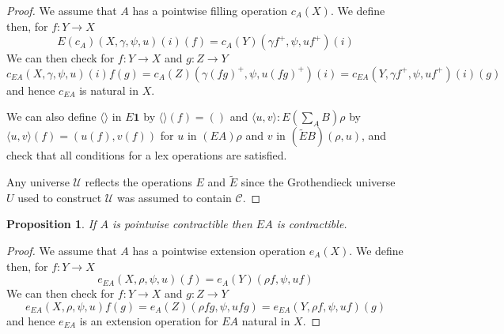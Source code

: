\documentclass[10pt,a4paper,draft]{article}
\newcommand{\Unit}{\mathbf{1}}
\newcommand{\UU}{\mathcal{U}}%
\newcommand{\CC}{{\mathcal C}}
\newcommand{\unit}{()} %
\newcommand{\unitF}{\langle \rangle}
\newcommand{\pairF}[2]{\langle #1,#2 \rangle}
\newcommand{\E}{E}
\newcommand{\EE}{\tilde{E}}
\renewcommand{\~}{\widetilde}
\newtheorem{proposition}[theorem]{Proposition}
\theoremstyle{definition}
\theoremstyle{remark} %
\begin{document}
\begin{proof}
  We assume that $A$ has a pointwise filling operation $c_A(X)$.
  We define then, for $f:Y\rightarrow X$
  \begin{equation*}
  \E(c_A)(X,\gamma,\psi,u)(i)(f) = c_A(Y)( \gamma f^+,\psi,u f^+)(i)
  \end{equation*}
  We can then check for $f:Y\rightarrow X$ and $g:Z\rightarrow Y$
  \begin{equation*}
  c_{\E A}(X,\gamma,\psi,u)(i)f(g) =
  c_A(Z)( \gamma (f g)^+,\psi,u (f g)^+)(i) =
  c_{\E A}(Y, \gamma f^+,\psi, u f^+)(i)(g)
  \end{equation*}
  and hence $c_{\E A}$ is natural in $X$.

  We can also define $\unitF$ in $\E \Unit$ by $\unitF(f) = \unit$
  and $\pairF{u}{v}:\E(\sum_A B)\rho$
  by $\pairF{u}{v}(f) = (u(f),v(f))$ for $u$ in $(\E A)\rho$ and
  $v$ in $(\EE B)(\rho,u)$, and check that all conditions for a lex operations are satisfied.

  Any universe $\UU$ reflects the operations $\E$ and $\EE$ since the Grothendieck universe $U$ used to construct $\UU$ was assumed to contain $\CC$.
\end{proof}

\begin{proposition}\label{Econtr}
  If $A$ is pointwise contractible then $\E A$ is contractible.
\end{proposition}
\begin{proof}
  We assume that $A$ has a pointwise extension operation $e_A(X)$.
  We define then, for $f:Y\rightarrow X$
  \begin{equation*}
  e_{\E A}(X,\rho,\psi,u)(f) = e_A(Y)(\rho f,\psi,uf)
  \end{equation*}
  We can then check for $f:Y\rightarrow X$ and $g:Z\rightarrow Y$
  \begin{equation*}
  e_{\E A}(X,\rho,\psi,u)f(g) =
  e_A(Z)(\rho f g,\psi,u f g) =
  e_{\E A}(Y,\rho f,\psi,u f)(g)
  \end{equation*}
  and hence $e_{\E A}$ is an extension operation for $\E A$ natural in $X$.
\end{proof}

\end{document}
